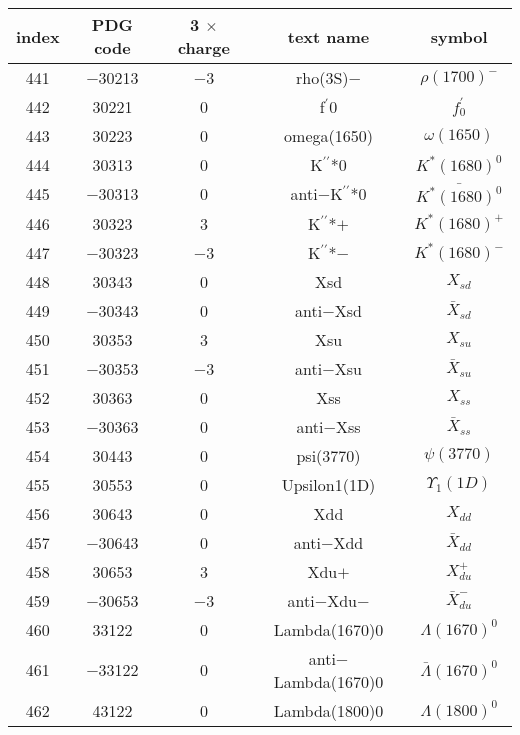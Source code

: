 \documentclass{article}
\begin{document}
\begin{table}[!htbp]
\centering
\begin{tabular}{|c|c|c|c|c|}
\hline
index & PDG code & 3 $\times$ charge & text name & symbol \\
\hline
441 & $-$30213 & $-$3 & rho(3S)$-$ & $\rho(1700)^{-}$ \\
\hline
442 & 30221 & 0 & f$^{\prime}$\underline{\hspace{0.6em}}0 & $f_{0}^{\prime}$ \\
\hline
443 & 30223 & 0 & omega(1650) & $\omega(1650)$ \\
\hline
444 & 30313 & 0 & K$^{\prime\prime}$*0 & $K^{*}(1680)^{0}$ \\
\hline
445 & $-$30313 & 0 & anti$-$K$^{\prime\prime}$*0 & $\bar{K^{*}(1680)^{0}}$ \\
\hline
446 & 30323 & 3 & K$^{\prime\prime}$*$+$ & $K^{*}(1680)^{+}$ \\
\hline
447 & $-$30323 & $-$3 & K$^{\prime\prime}$*$-$ & $K^{*}(1680)^{-}$ \\
\hline
448 & 30343 & 0 & Xsd & $X_{sd}$ \\
\hline
449 & $-$30343 & 0 & anti$-$Xsd & $\bar{X}_{sd}$ \\
\hline
450 & 30353 & 3 & Xsu & $X_{su}$ \\
\hline
451 & $-$30353 & $-$3 & anti$-$Xsu & $\bar{X}_{su}$ \\
\hline
452 & 30363 & 0 & Xss & $X_{ss}$ \\
\hline
453 & $-$30363 & 0 & anti$-$Xss & $\bar{X}_{ss}$ \\
\hline
454 & 30443 & 0 & psi(3770) & $\psi(3770)$ \\
\hline
455 & 30553 & 0 & Upsilon\underline{\hspace{0.6em}}1(1D) & $\Upsilon_{1}(1D)$ \\
\hline
456 & 30643 & 0 & Xdd & $X_{dd}$ \\
\hline
457 & $-$30643 & 0 & anti$-$Xdd & $\bar{X}_{dd}$ \\
\hline
458 & 30653 & 3 & Xdu$+$ & $X_{du}^{+}$ \\
\hline
459 & $-$30653 & $-$3 & anti$-$Xdu$-$ & $\bar{X}_{du}^{-}$ \\
\hline
460 & 33122 & 0 & Lambda(1670)0 & $\Lambda(1670)^{0}$ \\
\hline
461 & $-$33122 & 0 & anti$-$Lambda(1670)0 & $\bar{\Lambda}(1670)^{0}$ \\
\hline
462 & 43122 & 0 & Lambda(1800)0 & $\Lambda(1800)^{0}$ \\
\hline

\end{tabular}
\end{table}
\end{document}
